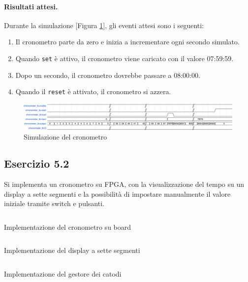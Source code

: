 \paragraph{Risultati attesi.}
Durante la simulazione [Figura \ref{fig:chronometer_tb}], gli eventi attesi sono i seguenti:

\begin{enumerate}
    \item Il cronometro parte da zero e inizia a incrementare ogni secondo simulato.
    \item Quando \texttt{set} è attivo, il cronometro viene caricato con il valore 07:59:59.
    \item Dopo un secondo, il cronometro dovrebbe passare a 08:00:00.
    \item Quando il \texttt{reset} è attivato, il cronometro si azzera.
\end{enumerate}

\begin{figure}[h]
    \centering
    \includegraphics[width=\textwidth]{img/chronometer_tb.pdf}
    \caption{Simulazione del cronometro}
    \label{fig:chronometer_tb}
\end{figure}

\subsection{Esercizio 5.2}
Si implementa un cronometro su FPGA, con la visualizzazione del tempo su un display a sette segmenti e la possibilità di impostare manualmente il valore iniziale tramite switch e pulsanti.

\begin{code}
    \inputminted{vhdl}{vhdl/chronometer_onboard.vhd}
    \caption{Implementazione del cronometro su board}
    \label{cod:chronometer_onboard}
\end{code}

\begin{code}
    \inputminted{vhdl}{vhdl/chronometer_seven_segments_display.vhd}
    \caption{Implementazione del display a sette segmenti}
    \label{cod:chronometer_seven_segments_display}
\end{code}

\begin{code}
    \inputminted{vhdl}{vhdl/chronometer_cathodes_manager.vhd}
    \caption{Implementazione del gestore dei catodi}
    \label{cod:chronometer_cathodes_manager}
\end{code}

